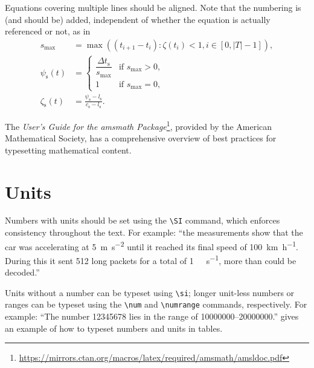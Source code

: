 Equations covering multiple lines should be aligned.
Note that the numbering is (and should be) added, independent of whether the equation is actually referenced or not, as in
\begin{align}
s_\mathrm{max} &=
    \max\left(
        \left(t_{i+1} - t_i\right)
            : \zeta\left(t_i\right) < 1, i \in \left[ 0, |T|-1 \right]
    \right)
,\\
\psi_{\mathrm{s}}\left(t\right) &=
    \begin{cases}
        \dfrac{\Delta t_{\mathrm{s}}}{s_\mathrm{max}}
            & \text{if $s_\mathrm{max} > 0$}, \\
        1
            & \text{if $s_\mathrm{max} = 0$},
    \end{cases}
\\
\zeta_{\mathrm{s}}\left(t\right) &=
    \frac{
        \psi_{\mathrm{s}} - l_{\mathrm{s}}
    }{
        c_{\mathrm{s}} - l_{\mathrm{s}}
    }
.
\end{align}

The \emph{User's Guide for the amsmath Package}\footnote{\url{https://mirrors.ctan.org/macros/latex/required/amsmath/amsldoc.pdf}}, provided by the American Mathematical Society, has a comprehensive overview of best practices for typesetting mathematical content.


\clearpage
\section{Units}

Numbers with units should be set using the \verb|\SI| command, which enforces consistency throughout the text.
For example: \enquote{the measurements show that the car was accelerating at \SI{5}{\meter\per\second\squared} until it reached its final speed of \SI{100}{\kilo\meter\per\hour}.
During this it sent \SI{512}{\bit} long packets for a total of \SI{1}{\mega\byte\per\second}, more than could be decoded.}


Units without a number can be typeset using \verb|\si|; longer unit-less numbers or ranges can be typeset using the \verb|\num| and \verb|\numrange| commands, respectively.
For example: \enquote{The number \num{12345678} lies in the range of \numrange{10000000}{20000000}.}
 gives an example of how to typeset numbers and units in tables.

